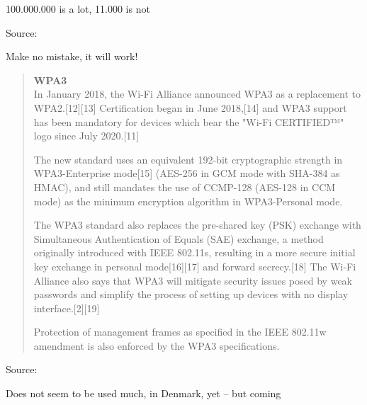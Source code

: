 \documentclass[Screen16to9,17pt]{foils}
\begin{document}


\centerline{100.000.000 is a lot, 11.000 is not}

Source:\\




\centerline{Make no mistake, it will work!}





\begin{quote}\small
{\bf WPA3}\\
In January 2018, the Wi-Fi Alliance announced WPA3 as a replacement to WPA2.[12][13] Certification began in June 2018,[14] and WPA3 support has been mandatory for devices which bear the "Wi-Fi CERTIFIED™" logo since July 2020.[11]

The new standard uses an equivalent 192-bit cryptographic strength in WPA3-Enterprise mode[15] (AES-256 in GCM mode with SHA-384 as HMAC), and still mandates the use of CCMP-128 (AES-128 in CCM mode) as the minimum encryption algorithm in WPA3-Personal mode.

The WPA3 standard also replaces the pre-shared key (PSK) exchange with Simultaneous Authentication of Equals (SAE) exchange, a method originally introduced with IEEE 802.11s, resulting in a more secure initial key exchange in personal mode[16][17] and forward secrecy.[18] The Wi-Fi Alliance also says that WPA3 will mitigate security issues posed by weak passwords and simplify the process of setting up devices with no display interface.[2][19]

Protection of management frames as specified in the IEEE 802.11w amendment is also enforced by the WPA3 specifications.
\end{quote}
Source: 

\begin{list2}
\item Does not seem to be used much, in Denmark, yet -- but coming
\end{list2}


\end{document}
